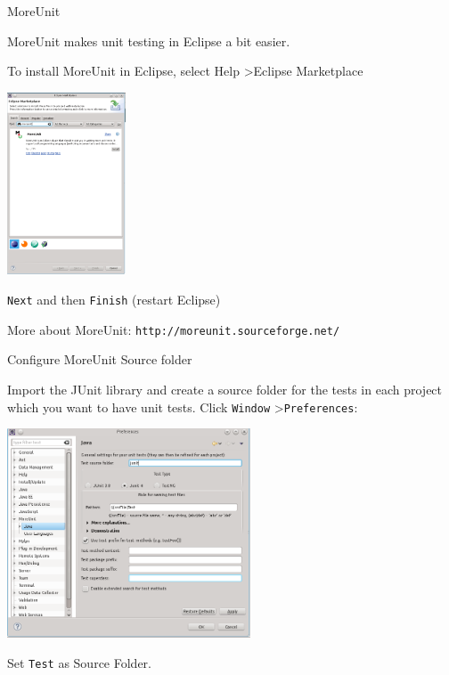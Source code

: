 \documentclass[11pt, xcolor=svgnames]{beamer}
\begin{document}
\begin{frame}{MoreUnit}

MoreUnit makes unit testing in Eclipse a bit easier.
  
To install MoreUnit in Eclipse, select Help \textgreater Eclipse Marketplace
  
  \begin{center}
    \includegraphics[width=100pt]{./figs/market}
  \end{center}
  
  \texttt{Next} and then \texttt{Finish} (restart Eclipse)

    More about MoreUnit: \texttt{http://moreunit.sourceforge.net/}
\end{frame}



\begin{frame}

Configure MoreUnit Source folder

  Import the JUnit library and create a source folder for the tests in each project which you want to have unit tests. Click \texttt{Window} \textgreater \texttt{Preferences}:

    \begin{center}
    \includegraphics[width=205pt]{./figs/config}                                            
    \end{center}
      
    Set \texttt{Test} as Source Folder.

\end{frame}
\end{document}
